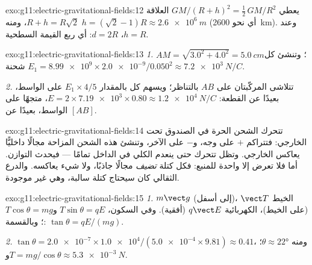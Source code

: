 \begin{solution}{exo:g11:electric-gravitational-fields:12}
يعطي $GM/(R+h)^2 = \tfrac12\,GM/R^2$ العلاقة $R + h = R\sqrt{2}$، ومنه
$h = (\sqrt{2} - 1)R \approx \qty{2.6e6}{m}$ (أي نحو \qty{2600}{km}). وعند
$h = R$، $d = 2R$: أي ربع القيمة السطحية.
\end{solution}

\begin{solution}{exo:g11:electric-gravitational-fields:13}
\emph{1.} $AM = \sqrt{3.0^2 + 4.0^2} = \qty{5.0}{cm}$؛ وتنشئ كل شحنة
$E_1 = \num{8.99e9} \times \num{2.0e-9} / 0.050^2
\approx \qty{7.2e3}{N/C}$.

\emph{2.} تتلاشى المركّبتان على $AB$ بالتناظر؛ ويسهم كل 
بالمقدار $E_1 \times 4/5$ على الواسط، بعيدًا عن القطعة:
$E = 2 \times \num{7.19e3} \times 0.80 \approx \qty{1.2e4}{N/C}$،
متجهًا على الواسط، بعيدًا عن $[AB]$.
\end{solution}

\begin{solution}{exo:g11:electric-gravitational-fields:14}
تتحرك الشحن الحرة في الصندوق تحت  الخارجي: فتتراكم $+$ على
وجه، و$-$ على الآخر، وتنشئ هذه الشحن المزاحة مجالًا
داخليًّا يعاكس الخارجي. وتظل تتحرك حتى ينعدم 
الكلي في الداخل تمامًا --- فيحدث التوازن. أما  فلا تعرض
إلا  واحدة للمنبع: فكل كتلة \emph{تضيف} مجالًا جاذبًا،
ولا شيء يعاكسه. والدرع الثقالي كان سيحتاج كتلة سالبة، وهي
غير موجودة.
\end{solution}

\begin{solution}{exo:g11:electric-gravitational-fields:15}
\emph{1.}  $m\vect g$ (إلى أسفل)،  الخيط $\vect T$ (على
الخيط)،  الكهربائية $q\vect E$ (أفقية). وفي السكون،
$T\sin\theta = qE$ و$T\cos\theta = mg$؛ وبالقسمة:
$\tan\theta = qE/(mg)$.

\emph{2.} $\tan\theta = \num{2.0e-7} \times \num{1.0e4} /
(\num{5.0e-4} \times 9.81) \approx 0.41$، ومنه $\theta \approx \ang{22}$؛
و$T = mg/\cos\theta \approx \qty{5.3e-3}{N}$.
\end{solution}

